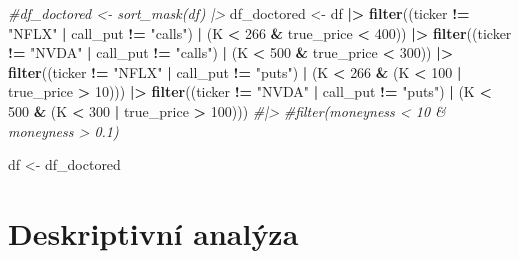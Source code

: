 \documentclass[
]{article}
\newenvironment{Shaded}{\begin{snugshade}}{\end{snugshade}}
\newcommand{\CommentTok}[1]{\textcolor[rgb]{0.56,0.35,0.01}{\textit{#1}}}
\newcommand{\DecValTok}[1]{\textcolor[rgb]{0.00,0.00,0.81}{#1}}
\newcommand{\FunctionTok}[1]{\textcolor[rgb]{0.13,0.29,0.53}{\textbf{#1}}}
\newcommand{\NormalTok}[1]{#1}
\newcommand{\OtherTok}[1]{\textcolor[rgb]{0.56,0.35,0.01}{#1}}
\newcommand{\SpecialCharTok}[1]{\textcolor[rgb]{0.81,0.36,0.00}{\textbf{#1}}}
\newcommand{\StringTok}[1]{\textcolor[rgb]{0.31,0.60,0.02}{#1}}
\begin{document}
\begin{Shaded}
\begin{Highlighting}[]
\CommentTok{\#df\_doctored \textless{}{-} sort\_mask(df) |\textgreater{}}
\NormalTok{df\_doctored }\OtherTok{\textless{}{-}}\NormalTok{ df }\SpecialCharTok{|\textgreater{}}
  \FunctionTok{filter}\NormalTok{((ticker }\SpecialCharTok{!=} \StringTok{"NFLX"} \SpecialCharTok{|}\NormalTok{ call\_put }\SpecialCharTok{!=} \StringTok{"calls"}\NormalTok{) }\SpecialCharTok{|}\NormalTok{ (K }\SpecialCharTok{\textless{}} \DecValTok{266} \SpecialCharTok{\&}\NormalTok{ true\_price }\SpecialCharTok{\textless{}} \DecValTok{400}\NormalTok{)) }\SpecialCharTok{|\textgreater{}}
  \FunctionTok{filter}\NormalTok{((ticker }\SpecialCharTok{!=} \StringTok{"NVDA"} \SpecialCharTok{|}\NormalTok{ call\_put }\SpecialCharTok{!=} \StringTok{"calls"}\NormalTok{) }\SpecialCharTok{|}\NormalTok{ (K }\SpecialCharTok{\textless{}} \DecValTok{500} \SpecialCharTok{\&}\NormalTok{ true\_price }\SpecialCharTok{\textless{}} \DecValTok{300}\NormalTok{)) }\SpecialCharTok{|\textgreater{}}
  \FunctionTok{filter}\NormalTok{((ticker }\SpecialCharTok{!=} \StringTok{"NFLX"} \SpecialCharTok{|}\NormalTok{ call\_put }\SpecialCharTok{!=} \StringTok{"puts"}\NormalTok{) }\SpecialCharTok{|}\NormalTok{ (K }\SpecialCharTok{\textless{}} \DecValTok{266} \SpecialCharTok{\&}\NormalTok{ (K }\SpecialCharTok{\textless{}} \DecValTok{100} \SpecialCharTok{|}\NormalTok{ true\_price }\SpecialCharTok{\textgreater{}} \DecValTok{10}\NormalTok{))) }\SpecialCharTok{|\textgreater{}}
  \FunctionTok{filter}\NormalTok{((ticker }\SpecialCharTok{!=} \StringTok{"NVDA"} \SpecialCharTok{|}\NormalTok{ call\_put }\SpecialCharTok{!=} \StringTok{"puts"}\NormalTok{) }\SpecialCharTok{|}\NormalTok{ (K }\SpecialCharTok{\textless{}} \DecValTok{500} \SpecialCharTok{\&}\NormalTok{ (K }\SpecialCharTok{\textless{}} \DecValTok{300} \SpecialCharTok{|}\NormalTok{ true\_price }\SpecialCharTok{\textgreater{}} \DecValTok{100}\NormalTok{))) }\CommentTok{\#|\textgreater{}}
  \CommentTok{\#filter(moneyness \textless{} 10 \& moneyness \textgreater{} 0.1)}

\NormalTok{df }\OtherTok{\textless{}{-}}\NormalTok{ df\_doctored}
\end{Highlighting}
\end{Shaded}

\section{Deskriptivní analýza}\label{deskriptivnuxed-analuxfdza}
\end{document}
